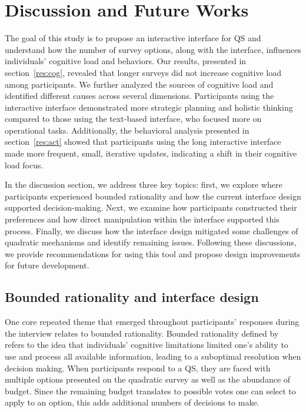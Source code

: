 \section{Discussion and Future Works}
\label{sec:discussion}
The goal of this study is to propose an interactive interface for QS and understand how the number of survey options, along with the interface, influences individuals' cognitive load and behaviors. Our results, presented in section~\ref{res:cog}, revealed that longer surveys did not increase cognitive load among participants. We further analyzed the sources of cognitive load and identified different causes across several dimensions. Participants using the interactive interface demonstrated more strategic planning and holistic thinking compared to those using the text-based interface, who focused more on operational tasks. Additionally, the behavioral analysis presented in section~\ref{res:act} showed that participants using the long interactive interface made more frequent, small, iterative updates, indicating a shift in their cognitive load focus.

In the discussion section, we address three key topics: first, we explore where participants experienced bounded rationality and how the current interface design supported decision-making. Next, we examine how participants constructed their preferences and how direct manipulation within the interface supported this process. Finally, we discuss how the interface design mitigated some challenges of quadratic mechanisms and identify remaining issues. Following these discussions, we provide recommendations for using this tool and propose design improvements for future development.


\subsection{Bounded rationality and interface design}
One core repeated theme that emerged throughout participants' responses during the interview relates to bounded rationality. Bounded rationality defined by~\textcite{simonBehavioralModelRational1955} refers to the idea that individuals' cognitive limitations limited one's ability to use and process all available information, leading to a suboptimal resolution when decision making. When participants respond to a QS, they are faced with multiple options presented on the quadratic survey as well as the abundance of budget. Since the remaining budget translates to possible votes one can select to apply to an option, this adds additional numbers of decisions to make.

